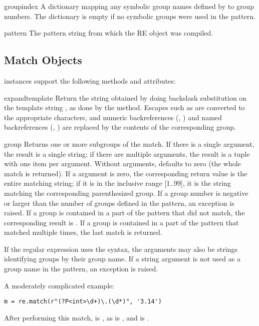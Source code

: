 \begin{memberdesc}[RegexObject]{groupindex}
A dictionary mapping any symbolic group names defined by
 to group numbers.  The dictionary is empty if no
symbolic groups were used in the pattern.
\end{memberdesc}

\begin{memberdesc}[RegexObject]{pattern}
The pattern string from which the RE object was compiled.
\end{memberdesc}


\subsection{Match Objects \label{match-objects}}

 instances support the following methods and
attributes:

\begin{methoddesc}[MatchObject]{expand}{template}
 Return the string obtained by doing backslash substitution on the
template string , as done by the  method.
Escapes such as  are converted to the appropriate
characters, and numeric backreferences (, ) and
named backreferences (, ) are replaced
by the contents of the corresponding group.
\end{methoddesc}

\begin{methoddesc}[MatchObject]{group}{}
Returns one or more subgroups of the match.  If there is a single
argument, the result is a single string; if there are
multiple arguments, the result is a tuple with one item per argument.
Without arguments,  defaults to zero (the whole match
is returned).
If a  argument is zero, the corresponding return value is the
entire matching string; if it is in the inclusive range [1..99], it is
the string matching the corresponding parenthesized group.  If a
group number is negative or larger than the number of groups defined
in the pattern, an  exception is raised.
If a group is contained in a part of the pattern that did not match,
the corresponding result is .  If a group is contained in a
part of the pattern that matched multiple times, the last match is
returned.

If the regular expression uses the  syntax,
the  arguments may also be strings identifying groups by
their group name.  If a string argument is not used as a group name in
the pattern, an  exception is raised.

A moderately complicated example:

\begin{verbatim}
m = re.match(r"(?P<int>\d+)\.(\d*)", '3.14')
\end{verbatim}

After performing this match,  is , as is
, and  is .
\end{methoddesc}


